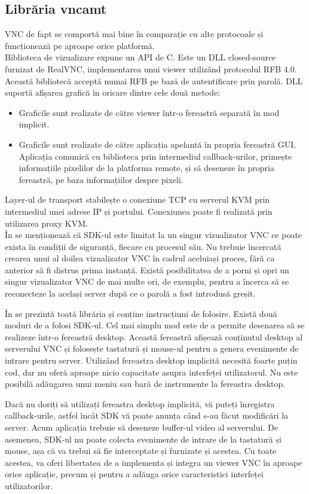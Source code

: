 \subsection{Librăria vncamt}

VNC de fapt se comportă mai bine în comparație cu alte protocoale și funcționează pe aproape orice platformă.\\

Biblioteca de vizualizare expune un API de C. Este un DLL closed-source furnizat de RealVNC, implementarea unui viewer utilizând protocolul RFB 4.0. Această bibliotecă acceptă numai RFB pe bază de autentificare prin parolă. DLL suportă afișarea grafică în oricare dintre cele două metode:

\begin{itemize}
  \item Graficile sunt realizate de către viewer într-o fereastră separată în mod implicit.
  \item Graficile sunt realizate de către aplicația apelantă în propria fereastră GUI. Aplicația comunică cu biblioteca prin intermediul callback-urilor, primește informațiile pixelilor de la platforma remote, și să deseneze în propria fereastră, pe baza informațiilor despre pixeli.
\end{itemize}

Layer-ul de transport stabilește o conexiune TCP cu serverul KVM prin intermediul unei adrese IP și portului. Conexiunea poate fi realizată prin utilizarea proxy KVM.\\

În \cite{amt-sdk} se menționează că SDK-ul este limitat la un singur vizualizator  VNC ce poate exista în condiții de siguranță, fiecare cu procesul său. Nu trebuie încercată crearea unui al doilea vizualizator VNC în cadrul aceluiași proces, fără ca anterior să fi distrus prima instanță. Există posibilitatea de a porni și opri un singur vizualizator VNC de mai multe ori, de exemplu, pentru a încerca să se reconecteze la același server după ce o parolă a fost introdusă greșit.

În \cite{realvnc-sdk} se prezintă toată librăria și conține instrucțiuni de folosire.  Există două moduri de a folosi SDK-ul. Cel mai simplu mod este de a permite desenarea să se realizeze într-o fereastră desktop. Această fereastră afișează conținutul desktop al serverului VNC și folosește tastatură și mouse-ul pentru a genera evenimente de intrare pentru server. Utilizând fereastra desktop implicită necesită foarte puțin cod, dar nu oferă aproape nicio capacitate asupra interfeței utilizatorul. Nu este posibilă adăugarea unui meniu sau bară de instrumente la fereastra desktop.

Dacă nu doriți să utilizați fereastra desktop implicită, vă puteți înregistra callback-urile, astfel încât SDK vă poate anunța când s-au făcut modificări la server. Acum aplicația trebuie să deseneze buffer-ul video al serverului. De asemenea, SDK-ul nu poate colecta evenimente de intrare de la tastatură și mouse, așa că va trebui să fie interceptate și furnizate și acestea. Cu toate acestea, va oferi libertatea de a implementa și integra un viewer VNC în aproape orice aplicație, precum și pentru a adăuga orice caracteristici interfeței utilizatorilor.

